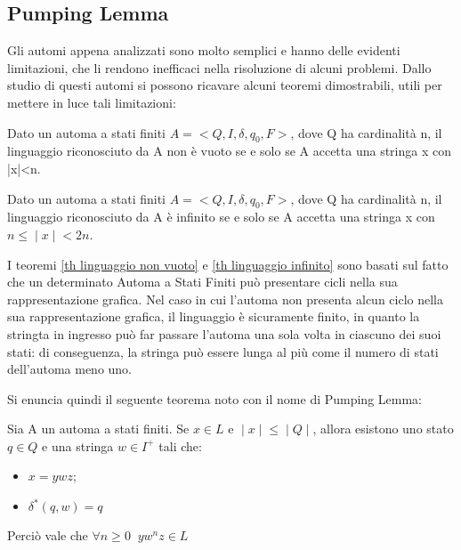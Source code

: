   \subsection{Pumping Lemma}
  Gli automi appena analizzati sono molto semplici e hanno delle evidenti limitazioni, che li rendono inefficaci nella risoluzione di alcuni problemi. 
  Dallo studio di questi automi si possono ricavare alcuni teoremi dimostrabili, utili per mettere in luce tali limitazioni:

  \begin{theorem} \label{th linguaggio non vuoto}
    Dato un automa a stati finiti \(A=<Q, I, \delta, q_0, F>\), dove Q ha cardinalità n, il linguaggio riconosciuto da A non è vuoto se e solo se A accetta una stringa x con \;|\;x\;|\;<n.
  \end{theorem}

  \begin{theorem} \label{th linguaggio infinito}
    Dato un automa a stati finiti \(A=<Q, I, \delta, q_0, F>\), dove Q ha cardinalità n, il linguaggio riconosciuto da A è infinito se e solo se A accetta una stringa x con \(n\le \;|\;x\;|\; < 2n\).
  \end{theorem}

  I teoremi \ref{th linguaggio non vuoto} e \ref{th linguaggio infinito} sono basati sul fatto che un determinato Automa a Stati Finiti può presentare cicli nella sua rappresentazione grafica. Nel caso in cui l'automa non presenta alcun ciclo nella sua rappresentazione grafica, il linguaggio è sicuramente finito, in quanto la stringta in ingresso può far passare l'automa una sola volta in ciascuno dei suoi stati: di conseguenza, la stringa può essere lunga al più come il numero di stati dell'automa meno uno. 

  Si enuncia quindi il seguente teorema noto con il nome di Pumping Lemma:

  \begin{theorem} \label{Pumping Lemma}
    Sia A un automa a stati finiti. Se \(x \in L\)  e \(\;|\;x\;|\;\leq\;|\;Q\;|\;\), allora esistono uno stato \(q \in Q\) e una stringa \(w \in I^+\) tali che:
    \begin{itemize}
      \item \(x = ywz\);
      \item \(\delta^*(q,w)=q\)
    \end{itemize}
    Perciò vale che \(\forall n\geq 0 \;\; yw^nz\in L\)
  \end{theorem}

